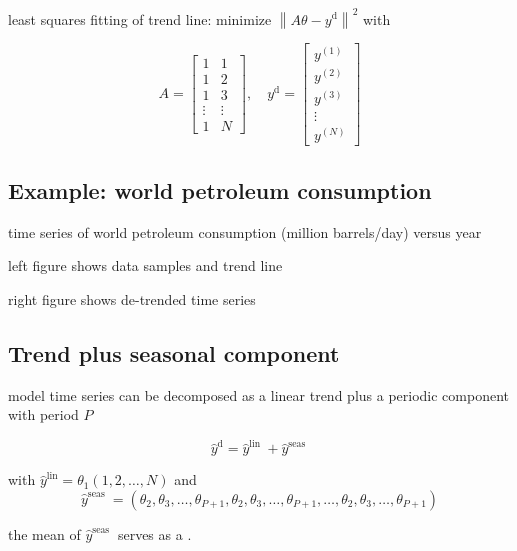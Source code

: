 \begin{problem}
    least squares fitting of trend line: minimize $ \left\|A \theta-y^{\mathrm{d}}\right\|^{2} $ with

$$ A=\left[\begin{array}{cc}1 & 1 \\ 1 & 2 \\ 1 & 3 \\ \vdots & \vdots \\ 1 & N\end{array}\right], \quad y^{\mathrm{d}}=\left[\begin{array}{c}y^{(1)} \\ y^{(2)} \\ y^{(3)} \\ \vdots \\ y^{(N)}\end{array}\right] $$
\end{problem}


\subsection{Example: world petroleum consumption}


time series of world petroleum consumption (million barrels/day) versus year

left figure shows data samples and trend line

right figure shows de-trended time series


\subsection{Trend plus seasonal component}

\begin{proposition}
    model time series can be decomposed as a linear trend plus a periodic component with period $ P $

    $$
    \hat{y}^{\mathrm{d}}=\hat{y}^{\text {lin }}+\hat{y}^{\text {seas }}
    $$

    with $ \hat{y}^{\operatorname{lin}}=\theta_{1}(1,2, \ldots, N) $ and
$$
\hat{y}^{\text {seas }}=\left(\theta_{2}, \theta_{3}, \ldots, \theta_{P+1}, \theta_{2}, \theta_{3}, \ldots, \theta_{P+1}, \ldots, \theta_{2}, \theta_{3}, \ldots, \theta_{P+1}\right)
$$
\end{proposition}

\begin{definition}[offset]
    the mean of $ \hat{y}^{\text {seas }} $ serves as a .
\end{definition}


